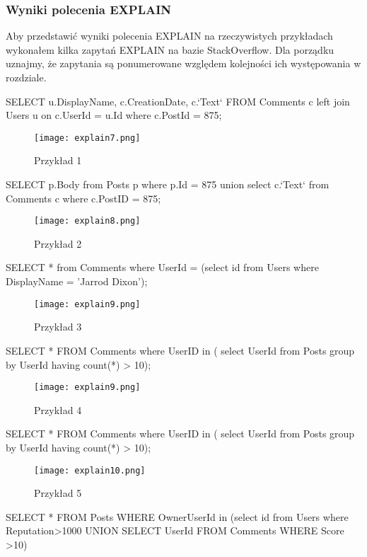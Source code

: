 \subsubsection{Wyniki polecenia EXPLAIN}
Aby przedstawić wyniki polecenia EXPLAIN na rzeczywistych przykładach wykonałem kilka zapytań EXPLAIN na bazie StackOverflow. Dla porządku uznajmy, że zapytania są ponumerowane względem kolejności ich występowania w rozdziale.
\begin{spverbatim}
	SELECT u.DisplayName, c.CreationDate, c.`Text` FROM  Comments c left join Users u on c.UserId = u.Id where c.PostId = 875;
\end{spverbatim}
\begin{figure}[H]
	\texttt{[image: explain7.png]} 
	\caption{Przykład 1}
\end{figure}
\begin{spverbatim}
	SELECT p.Body from Posts p where p.Id = 875 union
	select c.`Text` from Comments c where c.PostID = 875;
\end{spverbatim}
\begin{figure}[H]
	\texttt{[image: explain8.png]} 
	\caption{Przykład 2}
\end{figure}
\begin{spverbatim}
	SELECT * from Comments where UserId = (select id from Users where DisplayName = 'Jarrod Dixon');
\end{spverbatim}
\begin{figure}[H]
	\texttt{[image: explain9.png]} 
	\caption{Przykład 3}
\end{figure}
\begin{spverbatim}
	SELECT * FROM Comments where UserID in ( select UserId from Posts group by UserId having count(*) > 10);
\end{spverbatim}
\begin{figure}[H]
	\texttt{[image: explain9.png]} 
	\caption{Przykład 4}
\end{figure}
\begin{spverbatim}
	SELECT * FROM Comments where UserID in ( select UserId from Posts group by UserId having count(*) > 10);
\end{spverbatim}
\begin{figure}[H]
	\texttt{[image: explain10.png]} 
	\caption{Przykład 5}
\end{figure}
\begin{spverbatim}
	SELECT * FROM Posts  WHERE OwnerUserId in (select id from Users where Reputation>1000 UNION SELECT UserId FROM Comments WHERE Score >10)
\end{spverbatim}
